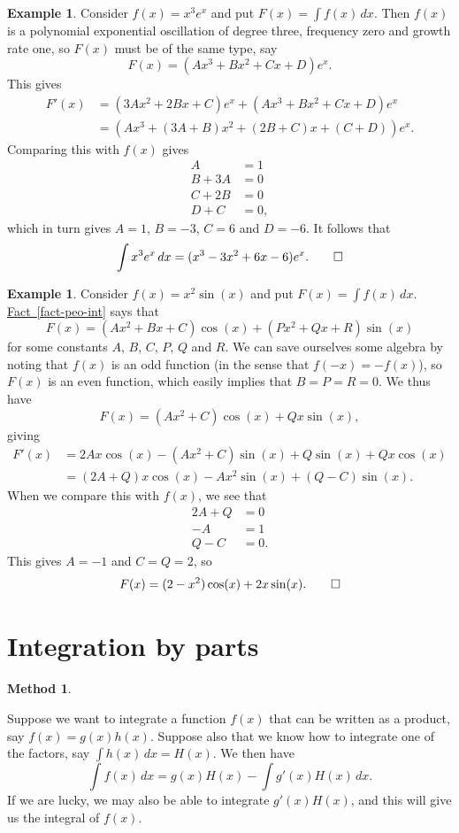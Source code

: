 \documentclass[a4paper]{book}
\renewcommand{\:}{\colon}
\newcommand{\bilabel}[1]{\hypertarget{#1}{\label{#1}}}
\newcommand{\biref}[2]{\hyperlink{#2}{#1~\ref*{#2}}}
\theoremstyle{definition}
\newtheorem{example}[theorem]{Example}
\newtheorem{method}[theorem]{Method}
\begin{document}
\begin{example}
 Consider $f(x)=x^3e^x$ and put $F(x)=\int f(x)\,dx$.  Then $f(x)$ is
 a polynomial exponential oscillation of degree three, frequency zero
 and growth rate one, so $F(x)$ must be of the same type, say
 \[ F(x) = (Ax^3 + Bx^2 + Cx + D)e^x. \]
 This gives
 \begin{align*}
  F'(x) &= (3Ax^2+2Bx+C)e^x + (Ax^3+Bx^2+Cx+D)e^x \\
        &= (Ax^3 + (3A+B)x^2 + (2B+C)x + (C+D))e^x. 
 \end{align*}
 Comparing this with $f(x)$ gives
 \begin{align*}
  A &= 1 \\
  B + 3A &= 0 \\
  C + 2B &= 0 \\
  D + C  &= 0,
 \end{align*}
 which in turn gives $A=1$, $B=-3$, $C=6$ and $D=-6$.  It follows that 
 \[ \int x^3 e^x\, dx = (x^3-3x^2+6x-6)e^x. \qed \]
\end{example}
\begin{example}
 Consider $f(x)=x^2\sin(x)$ and put $F(x)=\int f(x)\, dx$.  
 \biref{Fact}{fact-peo-int} says that 
 \[ F(x) = (Ax^2+Bx+C)\cos(x) + (Px^2+Qx+R)\sin(x) \]
 for some constants $A$, $B$, $C$, $P$, $Q$ and $R$.  We can save
 ourselves some algebra by noting that $f(x)$ is an odd function (in
 the sense that $f(-x)=-f(x)$), so $F(x)$ is an even function, which
 easily implies that $B=P=R=0$.  We thus have
 \[ F(x) = (Ax^2+C)\cos(x) + Q x \sin(x), \]
 giving
 \begin{align*}
  F'(x) &= 2Ax\cos(x) - (Ax^2+C)\sin(x) + 
           Q\sin(x) + Qx\cos(x) \\
        &= (2A+Q)x\cos(x) - Ax^2\sin(x) + (Q-C)\sin(x).
 \end{align*}
 When we compare this with $f(x)$, we see that
 \begin{align*}
  2A+Q &= 0 \\
  -A &= 1 \\
  Q-C &= 0.
 \end{align*}
 This gives $A=-1$ and $C=Q=2$, so 
 \[ F(x)=(2-x^2)\cos(x)+2x\sin(x). \qed \]
\end{example}

\section{Integration by parts}
\label{sec-int-parts}

\begin{method}\bilabel{alg-int-parts}
 Suppose we want to integrate a function $f(x)$ that can be written as
 a product, say $f(x)=g(x)h(x)$.  Suppose also that we know how to
 integrate one of the factors, say $\int h(x)\,dx=H(x)$.  We then have
 \[ \int f(x)\, dx = g(x)H(x) - \int g'(x)H(x)\, dx. \]
 If we are lucky, we may also be able to integrate $g'(x)H(x)$, and
 this will give us the integral of $f(x)$.  
\end{method}
\end{document}
